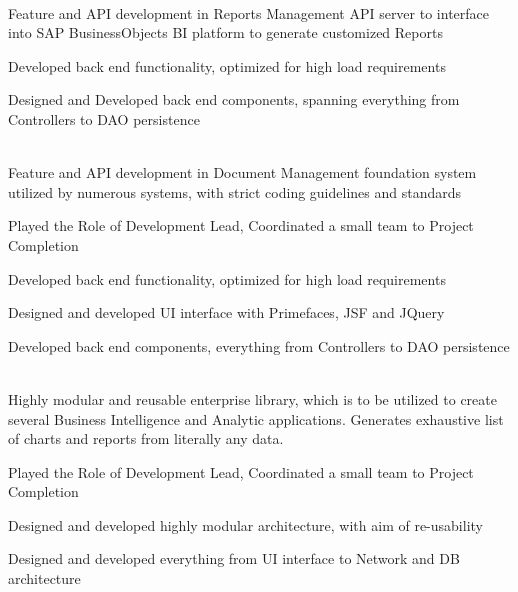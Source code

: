 \documentclass[]{deedy-resume-openfont}
\begin{document}

\clearpage

\hfill {}\\
Feature and API development in Reports Management API server to interface into SAP BusinessObjects BI platform to generate customized Reports\\
\begin{tightemize}
	\item Developed back end functionality, optimized for high load requirements
	\item Designed and Developed back end components, spanning everything from Controllers to DAO persistence
\end{tightemize}
\sectionsep

\hfill {}\\
Feature and API development in Document Management foundation system utilized by numerous systems, with strict coding guidelines and standards\\
\begin{tightemize}
	\item Played the Role of Development Lead, Coordinated a small team to Project Completion
	\item Developed back end functionality, optimized for high load requirements
	\item Designed and developed UI interface with Primefaces, JSF and JQuery
	\item Developed back end components, everything from Controllers to DAO persistence
\end{tightemize}
\sectionsep

\hfill {}\\
Highly modular and reusable enterprise library, which is to be utilized to create several Business Intelligence and Analytic applications. Generates exhaustive list of charts and reports from literally any data.\\
\begin{tightemize}
	\item Played the Role of Development Lead, Coordinated a small team to Project Completion
	\item Designed and developed highly modular architecture, with aim of re-usability
	\item Designed and developed everything from UI interface to Network and DB architecture
\end{tightemize}
\sectionsep
\end{document}
